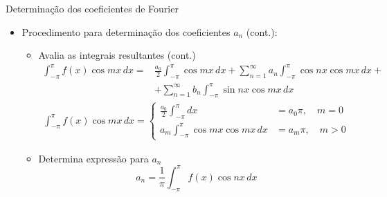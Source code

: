      \begin{slide}[toc=]{Determinação dos coeficientes de Fourier}
	      \begin{itemize}
		      \item Procedimento para determinação dos coeficientes $a_n$ (cont.):
			      \begin{itemize}
				      \item Avalia as integrais resultantes (cont.)
					      \begin{align*}
						      \int_{-\pi}^\pi f(x)\cos mx\, dx =&\frac{a_0}{2}\int_{-\pi}^\pi\cos mx\, dx + \sum_{n=1}^\infty a_n\int_{-\pi}^\pi \cos nx\cos mx\, dx +\\
						      &+\sum_{n=1}^\infty b_n\int_{-\pi}^\pi \sin nx\cos mx\, dx
					      \end{align*}\pause
					      \begin{align*}
						      \int_{-\pi}^\pi f(x)\cos mx\, dx =\begin{cases}
							      \frac{a_0}{2}\int_{-\pi}^\pi dx &= a_0\pi, \quad m=0\\
							      a_m\int_{-\pi}^\pi \cos mx\cos mx\, dx &= a_m\pi, \quad m>0
						      \end{cases}
					      \end{align*}\pause
				      \item Determina expressão para $a_n$
					      \begin{equation*}
						      a_n = \frac{1}{\pi}\int_{-\pi}^\pi f(x)\cos nx\, dx
					      \end{equation*}
			      \end{itemize}
            \end{itemize}
      \end{slide}

